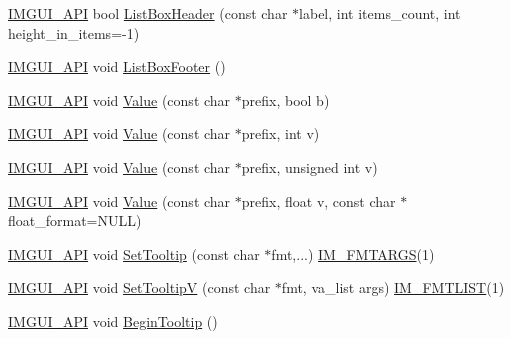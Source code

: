 \begin{DoxyCompactItemize}
\item 
\mbox{\hyperlink{imgui_8h_a43829975e84e45d1149597467a14bbf5}{I\+M\+G\+U\+I\+\_\+\+A\+PI}} bool \mbox{\hyperlink{namespace_im_gui_a6c5c48e5e5b90365f3f6faaa3307af26}{List\+Box\+Header}} (const char $\ast$label, int items\+\_\+count, int height\+\_\+in\+\_\+items=-\/1)
\item 
\mbox{\hyperlink{imgui_8h_a43829975e84e45d1149597467a14bbf5}{I\+M\+G\+U\+I\+\_\+\+A\+PI}} void \mbox{\hyperlink{namespace_im_gui_a9a0a8f6a4a67280dce7bd91310a83a03}{List\+Box\+Footer}} ()
\item 
\mbox{\hyperlink{imgui_8h_a43829975e84e45d1149597467a14bbf5}{I\+M\+G\+U\+I\+\_\+\+A\+PI}} void \mbox{\hyperlink{namespace_im_gui_a1b3324308e43eeded5c3599fa0f03e85}{Value}} (const char $\ast$prefix, bool b)
\item 
\mbox{\hyperlink{imgui_8h_a43829975e84e45d1149597467a14bbf5}{I\+M\+G\+U\+I\+\_\+\+A\+PI}} void \mbox{\hyperlink{namespace_im_gui_a654ceb70f2dd1598f88861f54764ee08}{Value}} (const char $\ast$prefix, int v)
\item 
\mbox{\hyperlink{imgui_8h_a43829975e84e45d1149597467a14bbf5}{I\+M\+G\+U\+I\+\_\+\+A\+PI}} void \mbox{\hyperlink{namespace_im_gui_aec80a3e35bf7c1ff5704334e5a3ebd5a}{Value}} (const char $\ast$prefix, unsigned int v)
\item 
\mbox{\hyperlink{imgui_8h_a43829975e84e45d1149597467a14bbf5}{I\+M\+G\+U\+I\+\_\+\+A\+PI}} void \mbox{\hyperlink{namespace_im_gui_a0c8b87438082a1d0a46ae2a76090ca16}{Value}} (const char $\ast$prefix, float v, const char $\ast$float\+\_\+format=N\+U\+LL)
\item 
\mbox{\hyperlink{imgui_8h_a43829975e84e45d1149597467a14bbf5}{I\+M\+G\+U\+I\+\_\+\+A\+PI}} void \mbox{\hyperlink{namespace_im_gui_a313073fa01b8a9791f241ef93091ce92}{Set\+Tooltip}} (const char $\ast$fmt,...) \mbox{\hyperlink{imgui_8h_a1251c2f9ddac0873dbad8181bd82c9f1}{I\+M\+\_\+\+F\+M\+T\+A\+R\+GS}}(1)
\item 
\mbox{\hyperlink{imgui_8h_a43829975e84e45d1149597467a14bbf5}{I\+M\+G\+U\+I\+\_\+\+A\+PI}} void \mbox{\hyperlink{namespace_im_gui_a3826acf68fc4a12bb66401575f51d6a2}{Set\+TooltipV}} (const char $\ast$fmt, va\+\_\+list args) \mbox{\hyperlink{imgui_8h_a047693beb7f899f5deab1e20202016b3}{I\+M\+\_\+\+F\+M\+T\+L\+I\+ST}}(1)
\item 
\mbox{\hyperlink{imgui_8h_a43829975e84e45d1149597467a14bbf5}{I\+M\+G\+U\+I\+\_\+\+A\+PI}} void \mbox{\hyperlink{namespace_im_gui_a36816a48385f4759d746a03cf6202512}{Begin\+Tooltip}} ()
\item 

\end{DoxyCompactItemize}
